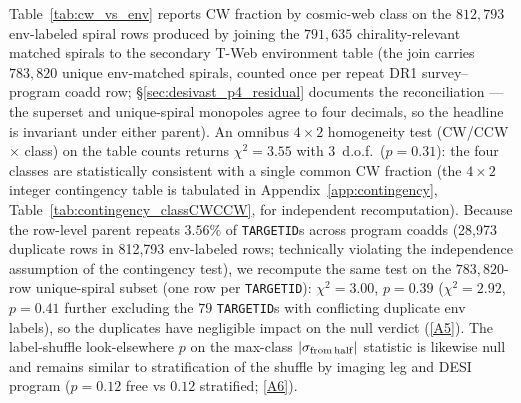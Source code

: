 \documentclass[twocolumn,linenumbers]{aastex702}
\newcommand{\repoBase}{https://github.com/Hubify-Projects/bigbounce/blob/main}
\begin{document}
Table~\ref{tab:cw_vs_env} reports CW fraction by cosmic-web class on
the $812{,}793$ env-labeled spiral rows produced by joining the
$791{,}635$ chirality-relevant matched spirals to the secondary T-Web
environment table (the join carries $783{,}820$ unique env-matched
spirals, counted once per repeat DR1 survey--program coadd row;
\S\ref{sec:desivast_p4_residual} documents the reconciliation — the
superset and unique-spiral monopoles agree to four decimals, so the
headline is invariant under either parent). An omnibus $4\times2$
homogeneity test (CW/CCW $\times$ class) on the table counts returns
$\chi^2 = 3.55$ with 3~d.o.f.\ ($p = 0.31$): the four classes are
statistically consistent with a single common CW fraction (the
$4{\times}2$ integer contingency table is tabulated in
Appendix~\ref{app:contingency}, Table~\ref{tab:contingency_classCWCCW},
for independent recomputation). Because
the row-level parent repeats $3.56\%$ of \texttt{TARGETID}s across program coadds
(28{,}973 duplicate rows in 812{,}793 env-labeled rows; technically violating the independence assumption of
the contingency test), we recompute the same test on the
$783{,}820$-row unique-spiral subset (one row per \texttt{TARGETID}):
$\chi^2 = 3.00$, $p = 0.39$ ($\chi^2 = 2.92$, $p = 0.41$ further
excluding the $79$ \texttt{TARGETID}s with conflicting duplicate env
labels), so the duplicates have negligible impact on the null verdict
(\href{\repoBase/pipelines/p5\_desi\_chirality/outputs/21\_r23conf\_meta\_closures.json}{[A5]}). The
label-shuffle look-elsewhere $p$ on the max-class
$|\sigma_{\rm from\,half}|$ statistic is likewise null and remains similar
to stratification of the shuffle by imaging leg and DESI program
($p = 0.12$ free vs $0.12$ stratified;
\href{\repoBase/pipelines/p5\_desi\_chirality/outputs/18\_v0151\_stratified\_and\_density.json}{[A6]}).
\end{document}
